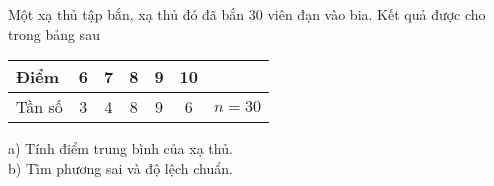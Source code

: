 \begin{bt}%
	Một xạ thủ tập bắn, xạ thủ đó đã bắn $30$ viên đạn vào bia. Kết quả được cho trong bảng sau
	\begin{center}
		\begin{tabular}{|l|c|c|c|c|c|c|}
			\hline
			Điểm   & 6 & 7 & 8 & 9 & 10 &      \\ \hline
			Tần số & 3 & 4 & 8 & 9 & 6  & $n=30$ \\ \hline
		\end{tabular}
	\end{center}
	a) Tính điểm trung bình của xạ thủ.\\
	b) Tìm phương sai và độ lệch chuẩn.
\end{bt}

